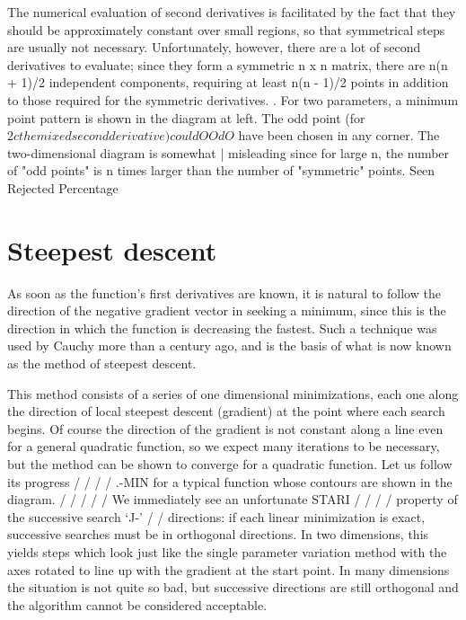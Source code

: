     The numerical evaluation of second derivatives is facilitated by
the fact that they should be approximately constant over small regions,
so that symmetrical steps are usually not necessary.  Unfortunately,
however, there are a lot of second derivatives to evaluate;  since they
form a symmetric n x n matrix, there are n(n + 1)/2 independent
components, requiring at least n(n - 1)/2 points  in addition to those
                                    required for the symmetric derivatives.
                                    . For two parameters, a minimum
                                     point pattern is shown in the
                                    diagram at left. The odd point (for
   $2                 c             the mixed second derivative) could
                 O O dO$          have been chosen in any corner. The
                                    two-dimensional diagram is somewhat
                     |              misleading since for large n, the
                                    number of "odd points" is n times
                                    larger than the number of "symmetric" points.
                  Seen Rejected  Percentage
 
\section{Steepest descent}
 
     As soon as the function's first derivatives are known, it is natural
to follow the direction of the negative gradient vector in seeking a
minimum, since this is the direction in which the function is decreasing
the fastest.  Such a technique was used by Cauchy more than a century
ago, and is the basis of what is now known as the method of steepest
descent.
 
     This method consists of a series of one dimensional minimizations,
each one along the direction of local steepest descent (gradient) at the
point where each search begins.  Of course the direction of the gradient
is not constant along a line even for a general quadratic function, so
we expect many iterations to be necessary, but the method can be shown
to converge for a quadratic function.  Let us follow its progress
                    / / / /  .-MIN  for a typical function whose contours are shown
                                         in the diagram.
                        / / /  / /  We immediately see an unfortunate
                   STARI  / / / /  property of the successive search
                        `J-' / /  directions: if each linear minimization is exact,
                                      successive searches must be in orthogonal
                                      directions.  In two dimensions,
                                      this yields steps which look just
like the single parameter variation method with the axes rotated to
line up with the gradient at the start point.  In many dimensions the
situation is not quite so bad, but successive directions are still
orthogonal and the algorithm cannot be considered acceptable.
 

